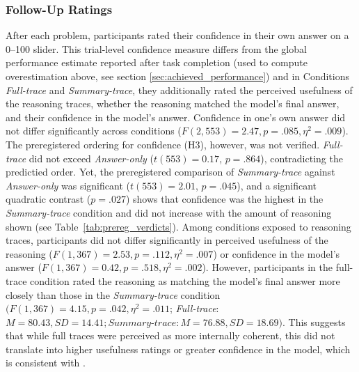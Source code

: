 \documentclass[manuscript,review,anonymous]{acmart}
\begin{document}
\subsubsection{Follow-Up Ratings}
After each problem, participants rated their confidence in their own answer on a 0--100 slider. This trial-level confidence measure differs from the global performance estimate reported after task completion (used to compute overestimation above, see section \ref{sec:achieved_performance}) and in Conditions \textit{Full-trace} and \textit{Summary-trace}, they additionally rated the perceived usefulness of the reasoning traces, whether the reasoning matched the model's final answer, and their confidence in the model's answer. Confidence in one's own answer did not differ significantly across conditions ($F(2,553) = 2.47, p = .085, \eta^2 = .009$). 
The preregistered ordering for confidence (H3), however, was not verified. \textit{Full-trace} did not exceed \textit{Answer-only} ($t(553) = 0.17$, $p = .864$), contradicting the predictied order. Yet, the preregistered comparison of \textit{Summary-trace} against \textit{Answer-only}  was significant ($t(553) = 2.01$, $p = .045$), and a significant quadratic contrast ($p = .027$) shows that confidence was the highest in the \textit{Summary-trace} condition and did not increase with the amount of reasoning shown (see Table~\ref{tab:prereg_verdicts}).
Among conditions exposed to reasoning traces, participants did not differ significantly in perceived usefulness of the reasoning ($F(1,367) = 2.53, p = .112, \eta^2 = .007$) or confidence in the model's answer ($F(1,367) = 0.42, p = .518, \eta^2= .002$). However, participants in the full-trace condition rated the reasoning as matching the model's final answer more closely than those in the \textit{Summary-trace} condition $(F(1,367) = 4.15, p = .042, \eta^2= .011$; \textit{Full-trace}: $M = 80.43, SD = 14.41; \textit{Summary-trace}: M = 76.88, SD = 18.69)$. This suggests that while full traces were perceived as more internally coherent, this did not translate into higher usefulness ratings or greater confidence in the model, which is consistent with \cite{von2025knowing}.
\end{document}
